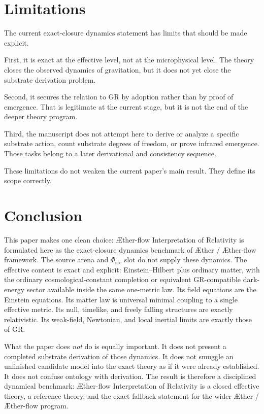 \documentclass[11pt]{article}
\newcommand{\Aether}{\AE{}ther}
\newcommand{\Aflow}{\AE{}ther-flow}
\newcommand{\TheoryName}{\Aflow{} Interpretation of Relativity}
\newcommand{\TheoryProgram}{\Aether{} / \Aflow{} framework}
\newcommand{\PhiSrc}{\Phi_{\mathrm{src}}}
\begin{document}
\section{Limitations}

The current exact-closure dynamics statement has limits that should be made explicit.

First, it is exact at the effective level, not at the microphysical level. The theory closes the observed dynamics of gravitation, but it does not yet close the substrate derivation problem.

Second, it secures the relation to GR by adoption rather than by proof of emergence. That is legitimate at the current stage, but it is not the end of the deeper theory program.

Third, the manuscript does not attempt here to derive or analyze a specific substrate action, count substrate degrees of freedom, or prove infrared emergence. Those tasks belong to a later derivational and consistency sequence.

These limitations do not weaken the current paper's main result. They define its scope correctly.

\section{Conclusion}

This paper makes one clean choice: \TheoryName{} is formulated here as the
exact-closure dynamics benchmark of \TheoryProgram{}. The source arena and
\(\PhiSrc\) slot do not supply these dynamics. The effective content is exact
and explicit: Einstein--Hilbert plus ordinary matter, with the ordinary
cosmological-constant completion or equivalent GR-compatible dark-energy
sector available inside the same one-metric law. Its field equations are the
Einstein equations. Its matter law is universal minimal coupling to a single
effective metric. Its null, timelike, and freely falling structures are
exactly relativistic. Its weak-field, Newtonian, and local inertial limits are
exactly those of GR.

What the paper does \emph{not} do is equally important. It does not present a completed substrate derivation of those dynamics. It does not smuggle an unfinished candidate model into the exact theory as if it were already established. It does not confuse ontology with derivation. The result is therefore a disciplined dynamical benchmark: \TheoryName{} is a closed effective theory, a reference theory, and the exact fallback statement for the wider \Aether{} / \Aflow{} program.


\end{document}
